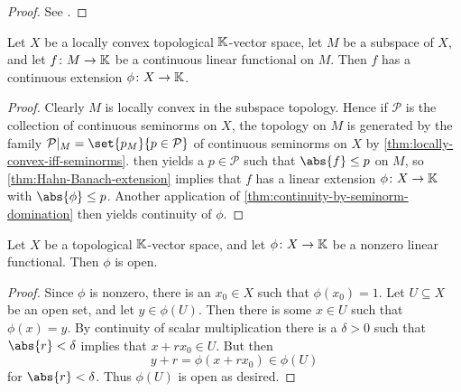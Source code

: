 \documentclass[article, a4paper, 11pt, oneside]{memoir}
\numberwithin{equation}{chapter}
\newcommand{\calP}{\mathcal{P}}
\begin{document}
\begin{proof}
    See \textcite[Theorem~5.6]{folland2007}.
\end{proof}


\begin{corollary}
    Let $X$ be a locally convex topological $\mathbb{K}$-vector space, let $M$ be a subspace of $X$, and let $f \colon M \to \mathbb{K}$ be a continuous linear functional on $M$. Then $f$ has a continuous extension $\phi \colon X \to \mathbb{K}$.
\end{corollary}

\begin{proof}
    Clearly $M$ is locally convex in the subspace topology. Hence if $\calP$ is the collection of continuous seminorms on $X$, the topology on $M$ is generated by the family $\calP|_M = \set{p_M}{p \in \calP}$ of continuous seminorms on $X$ by \cref{thm:locally-convex-iff-seminorms}.  then yields a $p \in \calP$ such that $\abs{f} \leq p$ on $M$, so \cref{thm:Hahn-Banach-extension} implies that $f$ has a linear extension $\phi \colon X \to \mathbb{K}$ with $\abs{\phi} \leq p$. Another application of \cref{thm:continuity-by-seminorm-domination} then yields continuity of $\phi$.
\end{proof}


\begin{lemma}
    \label{thm:functionals-are-open}
    Let $X$ be a topological $\mathbb{K}$-vector space, and let $\phi \colon X \to \mathbb{K}$ be a nonzero linear functional. Then $\phi$ is open.
\end{lemma}

\begin{proof}
    Since $\phi$ is nonzero, there is an $x_0 \in X$ such that $\phi(x_0) = 1$. Let $U \subseteq X$ be an open set, and let $y \in \phi(U)$. Then there is some $x \in U$ such that $\phi(x) = y$. By continuity of scalar multiplication there is a $\delta > 0$ such that $\abs{r} < \delta$ implies that $x + rx_0 \in U$. But then
    \begin{equation*}
        y + r
            = \phi(x + rx_0)
            \in \phi(U)
    \end{equation*}
    for $\abs{r} < \delta$. Thus $\phi(U)$ is open as desired.
\end{proof}
\end{document}
